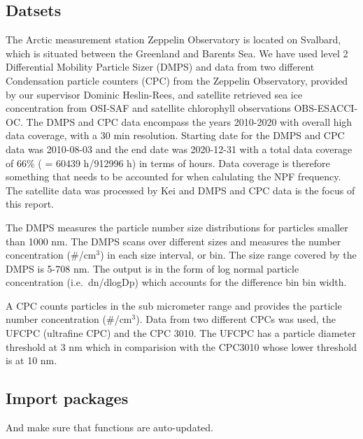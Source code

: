 \documentclass[11pt]{article}
\begin{document}
\hypertarget{datsets}{%
\subsection{Datsets}\label{datsets}}

The Arctic measurement station Zeppelin Observatory is located on
Svalbard, which is situated between the Greenland and Barents Sea. We
have used level 2 Differential Mobility Particle Sizer (DMPS) and data
from two different Condensation particle counters (CPC) from the
Zeppelin Observatory, provided by our supervisor Dominic Heslin-Rees,
and satellite retrieved sea ice concentration from OSI-SAF and satellite
chlorophyll observations OBS-ESACCI-OC. The DMPS and CPC data encompass
the years 2010-2020 with overall high data coverage, with a 30 min
resolution. Starting date for the DMPS and CPC data was 2010-08-03 and
the end date was 2020-12-31 with a total data coverage of 66\% ( = 60439
h/912996 h) in terms of hours. Data coverage is therefore something that
needs to be accounted for when calulating the NPF frequency. The
satellite data was processed by Kei and DMPS and CPC data is the focus
of this report.

The DMPS measures the particle number size distributions for particles
smaller than 1000 nm. The DMPS scans over different sizes and measures
the number concentration (\#/cm\(^3\)) in each size interval, or bin.
The size range covered by the DMPS is 5-708 nm. The output is in the
form of log normal particle concentration (i.e.~dn/dlogDp) which
accounts for the difference bin bin width.

A CPC counts particles in the sub micrometer range and provides the
particle number concentration (\#/cm\(^3\)). Data from two different
CPCs was used, the UFCPC (ultrafine CPC) and the CPC 3010. The UFCPC has
a particle diameter threshold at 3 nm which in comparision with the
CPC3010 whose lower threshold is at 10 nm.

    \hypertarget{import-packages}{%
\subsection{Import packages}\label{import-packages}}

And make sure that functions are auto-updated.
\end{document}
